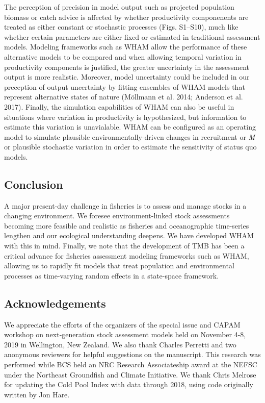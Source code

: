 \documentclass[]{article}
\begin{document}
The perception of precision in model output such as projected population
biomass or catch advice is affected by whether productivity componenents
are treated as either constant or stochastic processes (Figs. S1--S10),
much like whether certain parameters are either fixed or estimated in
traditional assessment models. Modeling frameworks such as WHAM allow
the performance of these alternative models to be compared and when
allowing temporal variation in productivity components is justified, the
greater uncertainty in the assessment output is more realistic.
Moreover, model uncertainty could be included in our preception of
output uncertainty by fitting ensembles of WHAM models that represent
alternative states of nature (Möllmann et al. 2014; Anderson et al.
2017). Finally, the simulation capabilities of WHAM can also be useful
in situations where variation in productivity is hypothesized, but
information to estimate this variation is unavialable. WHAM can be
configured as an operating model to simulate plausible
environmentally-driven changes in recruitment or \emph{M} or plausible
stochastic variation in order to estimate the sensitivity of status quo
models.

\hypertarget{conclusion}{%
\subsection{Conclusion}\label{conclusion}}

A major present-day challenge in fisheries is to assess and manage
stocks in a changing environment. We foresee environment-linked stock
assessments becoming more feasible and realistic as fisheries and
oceanographic time-series lengthen and our ecological understanding
deepens. We have developed WHAM with this in mind. Finally, we note that
the development of TMB has been a critical advance for fisheries
assessment modeling frameworks such as WHAM, allowing us to rapidly fit
models that treat population and environmental processes as time-varying
random effects in a state-space framework.

\hypertarget{acknowledgements}{%
\subsection*{Acknowledgements}\label{acknowledgements}}

We appreciate the efforts of the organizers of the special issue and
CAPAM workshop on next-generation stock assessment models held on
November 4-8, 2019 in Wellington, New Zealand. We also thank Charles
Perretti and two anonymous reviewers for helpful suggestions on the
manuscript. This research was performed while BCS held an NRC Research
Associateship award at the NEFSC under the Northeast Groundfish and
Climate Initiative. We thank Chris Melrose for updating the Cold Pool
Index with data through 2018, using code originally written by Jon Hare.
\end{document}
